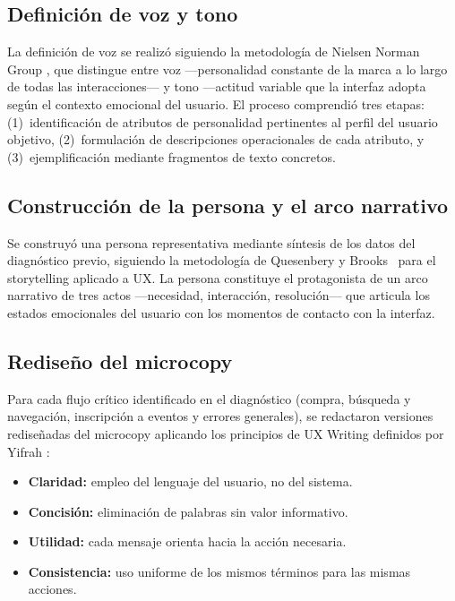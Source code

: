 \documentclass[conference]{IEEEtran}
\begin{document}
\subsection{Definición de voz y tono}

La definición de voz se realizó siguiendo la metodología de Nielsen Norman Group \cite{nng-voice}, que distingue entre voz —personalidad constante de la marca a lo largo de todas las interacciones— y tono —actitud variable que la interfaz adopta según el contexto emocional del usuario. El proceso comprendió tres etapas: (1)~identificación de atributos de personalidad pertinentes al perfil del usuario objetivo, (2)~formulación de descripciones operacionales de cada atributo, y (3)~ejemplificación mediante fragmentos de texto concretos.

\subsection{Construcción de la persona y el arco narrativo}

Se construyó una persona representativa mediante síntesis de los datos del diagnóstico previo, siguiendo la metodología de Quesenbery y Brooks~\cite{storytelling-ux} para el storytelling aplicado a UX. La persona constituye el protagonista de un arco narrativo de tres actos —necesidad, interacción, resolución— que articula los estados emocionales del usuario con los momentos de contacto con la interfaz.

\subsection{Rediseño del microcopy}

Para cada flujo crítico identificado en el diagnóstico (compra, búsqueda y navegación, inscripción a eventos y errores generales), se redactaron versiones rediseñadas del microcopy aplicando los principios de UX Writing definidos por Yifrah \cite{ux-writing}:

\begin{itemize}
    \item \textbf{Claridad:} empleo del lenguaje del usuario, no del sistema.
    \item \textbf{Concisión:} eliminación de palabras sin valor informativo.
    \item \textbf{Utilidad:} cada mensaje orienta hacia la acción necesaria.
    \item \textbf{Consistencia:} uso uniforme de los mismos términos para las mismas acciones.
\end{itemize}
\end{document}
